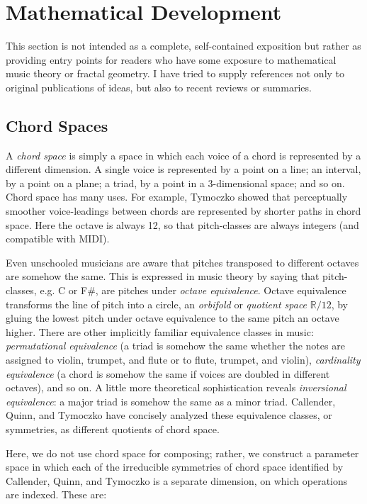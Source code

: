 \documentclass[english,11pt,letterpaper,onecolumn]{scrartcl}
\begin{document}
\section{Mathematical Development}

This section is not intended as a complete, self-contained exposition but 
rather as providing entry points for readers who have some exposure to 
mathematical music theory or fractal geometry. I have tried to supply 
references not only to original publications of ideas, but also to recent 
reviews or summaries.

\subsection{Chord Spaces}

A \textit{chord space} is simply a space in which each voice of a chord is represented 
by a different dimension. A single voice is represented by a point on a line; 
an interval, by a point on a plane; a triad, by a point in a 3-dimensional 
space; and so on. Chord space has many uses. For example, 
Tymoczko \cite{tymoczko2006geometry, tymoczko2011geometry} showed that 
perceptually smoother voice-leadings between chords are represented by shorter 
paths in chord space. Here the octave is always 12, so that pitch-classes 
are always integers (and compatible with MIDI).
                  
Even unschooled musicians are aware that pitches transposed to different 
octaves are somehow the same. This is expressed in music theory by saying that 
pitch-classes, e.g. C or F\#, are pitches under \textit{octave equivalence}. 
Octave equivalence transforms the line of pitch into a circle, an 
\textit{orbifold} or \textit{quotient space} $\mathbb{R}/12$, by 
gluing the lowest pitch under octave equivalence to the same pitch an octave 
higher. There are other implicitly familiar equivalence classes in music: 
\textit{permutational equivalence} (a triad is somehow the same whether the 
notes are assigned to violin, trumpet, and flute or to flute, trumpet, and 
violin), \textit{cardinality equivalence} (a chord is somehow the same if 
voices are doubled in different octaves), and so on. A little more theoretical 
sophistication reveals \textit{inversional equivalence}: a major triad is 
somehow the same as a minor triad. Callender, Quinn, and Tymoczko 
\cite{callender:346} have concisely analyzed these equivalence classes, or 
symmetries, as different quotients of chord space.

Here, we do not use chord space for composing; rather, we construct a parameter 
space in which each of the irreducible symmetries of chord space identified by 
Callender, Quinn, and Tymoczko is a separate dimension, on which operations 
are indexed. These are:
\end{document}
